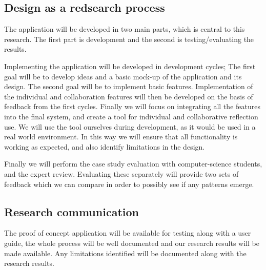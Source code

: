 \subsection{Design as a redsearch process}
The application will be developed in two main parts, which is central to this research. The first part is development and the second is testing/evaluating the results.

Implementing the application will be developed in development cycles; The first goal will be to develop ideas and a basic mock-up of the application and its design. The second goal will be to implement basic features. Implementation of the individual and collaboration features will then be developed on the basis of feedback from the first cycles. Finally we will focus on integrating all the features into the final system, and create a tool for individual and collaborative reflection use. We will use the tool ourselves during development, as it would be used in a real world environment. In this way we will ensure that all functionality is working as expected, and also identify limitations in the design. 

Finally we will perform the case study evaluation with computer-science students, and the expert review. Evaluating these separately will provide two sets of feedback which we can compare in order to possibly see if any patterns emerge. 

\subsection{Research communication}
The proof of concept application will be available for testing along with a user guide, the whole process will be well documented and our research results will be made available.
Any limitations identified  will be documented along with the research results. 



